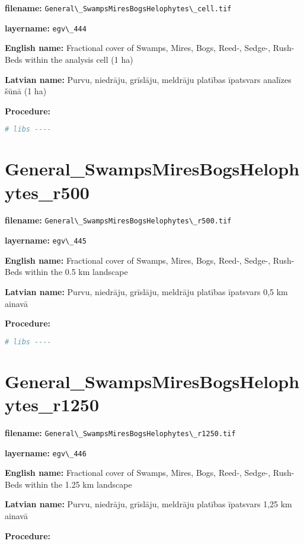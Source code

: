 \documentclass[
]{book}
\newcommand{\passthrough}[1]{#1}
\begin{document}
\textbf{filename:} \passthrough{\lstinline!General\_SwampsMiresBogsHelophytes\_cell.tif!}

\textbf{layername:} \passthrough{\lstinline!egv\_444!}

\textbf{English name:} Fractional cover of Swamps, Mires, Bogs, Reed-, Sedge-, Rush- Beds within the analysis cell (1 ha)

\textbf{Latvian name:} Purvu, niedrāju, grīslāju, meldrāju platības īpatsvars analīzes šūnā (1 ha)

\textbf{Procedure:}

\begin{lstlisting}[language=R]
# libs ----
\end{lstlisting}

\section{General\_SwampsMiresBogsHelophytes\_r500}\label{ch06.445}

\textbf{filename:} \passthrough{\lstinline!General\_SwampsMiresBogsHelophytes\_r500.tif!}

\textbf{layername:} \passthrough{\lstinline!egv\_445!}

\textbf{English name:} Fractional cover of Swamps, Mires, Bogs, Reed-, Sedge-, Rush- Beds within the 0.5 km landscape

\textbf{Latvian name:} Purvu, niedrāju, grīslāju, meldrāju platības īpatsvars 0,5 km ainavā

\textbf{Procedure:}

\begin{lstlisting}[language=R]
# libs ----
\end{lstlisting}

\section{General\_SwampsMiresBogsHelophytes\_r1250}\label{ch06.446}

\textbf{filename:} \passthrough{\lstinline!General\_SwampsMiresBogsHelophytes\_r1250.tif!}

\textbf{layername:} \passthrough{\lstinline!egv\_446!}

\textbf{English name:} Fractional cover of Swamps, Mires, Bogs, Reed-, Sedge-, Rush- Beds within the 1.25 km landscape

\textbf{Latvian name:} Purvu, niedrāju, grīslāju, meldrāju platības īpatsvars 1,25 km ainavā

\textbf{Procedure:}
\end{document}
